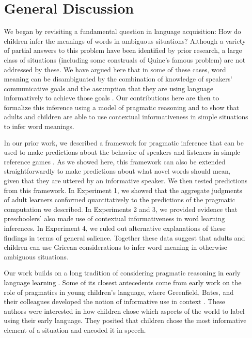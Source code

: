 \documentclass[man,noapacite]{apa2}
\begin{document}
\section{General Discussion}

We began by revisiting a fundamental question in language acquisition: How do children infer the meanings of words in ambiguous situations? Although a variety of partial answers to this problem have been identified by prior research, a large class of situations (including some construals of Quine's famous problem) are not addressed by these. We have argued here that in some of these cases, word meaning can be disambiguated by the combination of knowledge of speakers' communicative goals and the assumption that they are using language informatively to achieve those goals \cite{grice1975}. Our contributions here are then to formalize this inference using a model of pragmatic reasoning and to show that adults and children are able to use contextual informativeness in simple situations to infer word meanings.

In our prior work, we described a framework for pragmatic inference that can be used to make predictions about the behavior of speakers and listeners in simple reference games \cite{frank2012}. As we showed here, this framework can also be extended straightforwardly to make predictions about what novel words should mean, given that they are uttered by an informative speaker.  We then tested predictions from this framework. In Experiment 1, we showed that the aggregate judgments of adult learners conformed quantitatively to the predictions of the pragmatic computation we described. In Experiments 2 and 3, we provided evidence that preschoolers' also made use of contextual informativeness in word learning inferences. In Experiment 4, we ruled out alternative explanations of these findings in terms of general salience. Together these data suggest that adults and children can use Gricean considerations to infer word meaning in otherwise ambiguous situations. 

Our work builds on a long tradition of considering pragmatic reasoning in early language learning \cite{clark2003,bloom2002,tomasello2003}. Some of its closest antecedents come from early work on the role of pragmatics in young children's language, where Greenfield, Bates, and their colleagues developed the notion of informative use in context \cite{bates1976,greenfield1976,greenfield1978}. These authors were interested in how children chose which aspects of the world to label using their early language. They posited that children chose the most informative element of a situation and encoded it in speech. 
\end{document}
